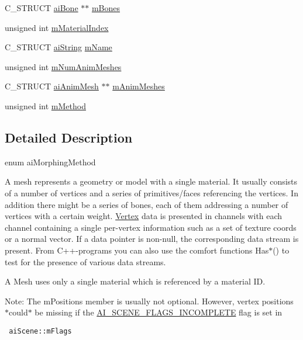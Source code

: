 \begin{CompactItemize}
C\_\-STRUCT \hyperlink{structai_bone}{aiBone} $\ast$$\ast$ \hyperlink{structai_mesh_0c0582a7f45b340b6a33552c53232539}{mBones}
\item 
unsigned int \hyperlink{structai_mesh_a2807c7ba172115203ed16047ad65f9e}{mMaterialIndex}
\item 
C\_\-STRUCT \hyperlink{structai_string}{aiString} \hyperlink{structai_mesh_8dd9433e0c5b008e3e5aee6c801d3b74}{mName}
\item 
unsigned int \hyperlink{structai_mesh_1692a300222b32348ae51779df4a697e}{mNumAnimMeshes}
\item 
C\_\-STRUCT \hyperlink{structai_anim_mesh}{aiAnimMesh} $\ast$$\ast$ \hyperlink{structai_mesh_5078f7db7e99ed05db89dfa412f0e990}{mAnimMeshes}
\item 
unsigned int \hyperlink{structai_mesh_3a6c8c5f1d6543bfdd930f6b07467665}{mMethod}
\end{CompactItemize}


\subsection{Detailed Description}
enum aiMorphingMethod 

A mesh represents a geometry or model with a single material. It usually consists of a number of vertices and a series of primitives/faces referencing the vertices. In addition there might be a series of bones, each of them addressing a number of vertices with a certain weight. \hyperlink{struct_vertex}{Vertex} data is presented in channels with each channel containing a single per-vertex information such as a set of texture coords or a normal vector. If a data pointer is non-null, the corresponding data stream is present. From C++-programs you can also use the comfort functions Has$\ast$() to test for the presence of various data streams.

A Mesh uses only a single material which is referenced by a material ID. \begin{Desc}
\item[Note:]The mPositions member is usually not optional. However, vertex positions $\ast$could$\ast$ be missing if the \hyperlink{scene_8h_64c3b662e066126207bb842fc406a745}{AI\_\-SCENE\_\-FLAGS\_\-INCOMPLETE} flag is set in 

\begin{Code}\begin{verbatim} aiScene::mFlags
\end{verbatim}
\end{Code}

 \end{Desc}


